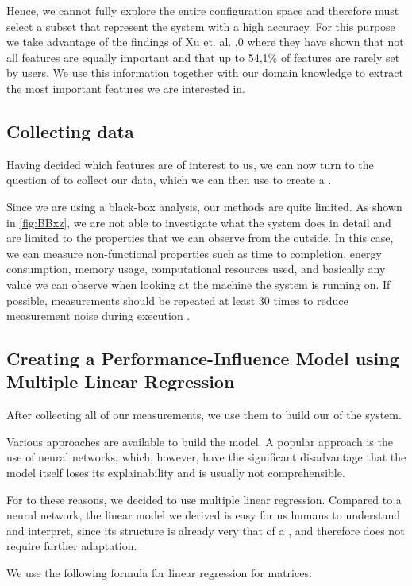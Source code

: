 Hence, we cannot fully explore the entire configuration space and therefore must select a subset that 
represent the system with a high accuracy. For this purpose we take advantage of the findings of Xu et. al. \cite{TooManyKnobs},0
where they have shown that not all features are equally important and that up to 54,1\% of features are rarely set by users. We use
this information together with our domain knowledge to extract the most important features we are interested in.

\subsection{Collecting data}
Having decided which features are of interest to us, we can now turn to the question of to collect our data,
which we can then use to create a \perfInfluenceModel.

Since we are using a black-box analysis, our methods are quite limited. As shown in \autoref{fig:BBxz}, we are not able to investigate what the system does 
in detail and are limited to the properties that we can observe from the outside. 
In this case, we can measure non-functional properties such as time to completion, energy consumption, memory usage, 
computational resources used, and basically any value we can observe when looking at the machine the system is running on. 
If possible, measurements should be repeated at least 30 times to reduce measurement noise during execution \cite{SampleSize}.


\subsection{Creating a Performance-Influence Model using Multiple Linear Regression}
After collecting all of our measurements, we use them to build our \perfInfluenceModel of the system. 

Various approaches are available to build the model.
A popular approach is the use of neural networks, which, however, 
have the significant disadvantage that the model itself loses its explainability and is usually not comprehensible.

For to these reasons, we decided to use multiple linear regression. Compared to a neural network, the linear model we 
derived is easy for us humans to understand and interpret, since its structure is already very that of a \perfInfluenceModel,
and therefore does not require further adaptation.

We use the following formula for linear regression for matrices\cite{Linear-Regression-Performance}:


